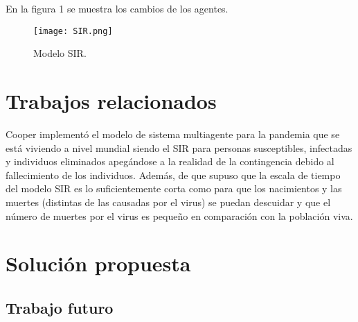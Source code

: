 \documentclass[final,6p,times,twocolumn]{elsarticle}
\begin{document}
En la figura 1 se muestra los cambios de los agentes.

\begin{figure} [h!]
\label{sir}
\centering
\texttt{[image: SIR.png]}
\caption{Modelo SIR.}
\end{figure}





\label{S:2.1}






\section{Trabajos relacionados}
\label{S:trela}
Cooper \cite{COOPER2020110057} implementó el modelo de sistema multiagente para la pandemia que se está viviendo a nivel mundial siendo el SIR para personas susceptibles, infectadas y individuos eliminados apegándose a la realidad de la contingencia debido al fallecimiento de los individuos. Además, de que supuso que la escala de tiempo del modelo SIR es lo suficientemente corta como para que los nacimientos y las muertes (distintas de las causadas por el virus) se puedan descuidar y que el número de muertes por el virus es pequeño en comparación con la población viva.


\section{Solución propuesta}
\label{S:Sprop}


\subsection{Trabajo futuro}

\clearpage



\end{document}
